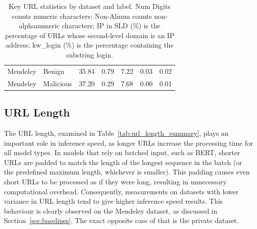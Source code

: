 \begin{table}[H]
{\begin{tabular}{lllllll}
            Mendeley         & Benign         & 35.84               & 0.79                & 7.22               & 0.03                    & 0.02                    \\
            Mendeley         & Malicious      & 37.20               & 0.29                & 7.68               & 0.00                    & 0.01                    \\
            \bottomrule
        \end{tabular}
    }
    \caption{Key URL statistics by dataset and label. Num Digits counts numeric characters; Non-Alnum counts non-alphanumeric characters; IP in SLD (\%) is the percentage of URLs whose second-level domain is an IP address; kw\_login (\%) is the percentage containing the substring login.}
    \label{tab:selected_url_features}
\end{table}

\subsection{URL Length}
\label{sec:url_length}

The URL length, examined in Table~\ref{tab:url_length_summary}, plays an important role in inference speed, as longer URLs increase the processing time for all model types. In models that rely on batched input, such as BERT, shorter URLs are padded to match the length of the longest sequence in the batch (or the predefined maximum length, whichever is smaller). This padding causes even short URLs to be processed as if they were long, resulting in unnecessary computational overhead. Consequently, measurements on datasets with lower variance in URL length tend to give higher inference speed results. This behaviour is clearly observed on the Mendeley dataset, as discussed in Section~\ref{sec:baselines}. The exact opposite case of that is the private dataset.

